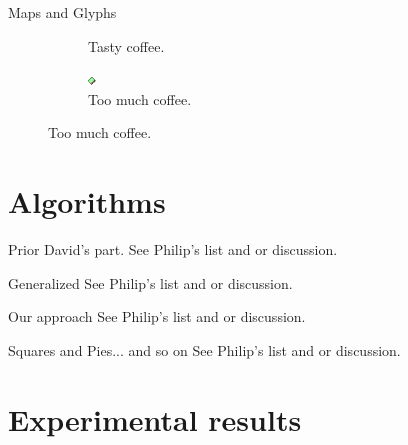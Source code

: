 \documentclass{beamer}
\begin{document}
\begin{frame}{Maps and Glyphs}
\begin{figure}[!b]
\begin{subfigure}[b]{0.45\linewidth}
         \caption{Tasty coffee.}
      \end{subfigure}
      \begin{subfigure}[b]{0.45\linewidth}
         \centering
	 \includegraphics[width=0.5\linewidth]{assets/symbol_square}
	 \caption{Too much coffee.}
      \end{subfigure}
  \end{figure}

  \end{frame}

  \section{Algorithms}

  \begin{frame}{Prior}
    David's part. See Philip's list and or discussion.
  \end{frame}

  \begin{frame}{Generalized}
    See Philip's list and or discussion.
  \end{frame}

  \begin{frame}{Our approach}
    See Philip's list and or discussion.
  \end{frame}

  \begin{frame}{Squares and Pies... and so on}
    See Philip's list and or discussion.
  \end{frame}

  \section{Experimental results}
\end{document}
